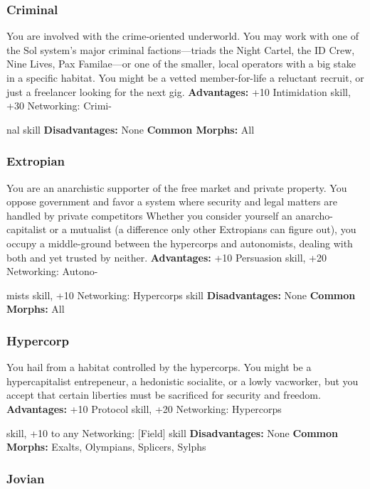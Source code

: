 \subsubsection{Criminal}

You are involved with the crime-oriented underworld. You 
may work with one of the Sol system's major criminal factions—triads
the Night Cartel, the ID Crew, Nine Lives, Pax
Familae—or one of the smaller, local operators with a big 
stake in a specific habitat. You might be a vetted member-for-life
a reluctant recruit, or just a freelancer looking for
the next gig.
\textbf{Advantages:} +10 Intimidation skill, +30 Networking: Crimi-

nal skill
\textbf{Disadvantages:} None
\textbf{Common Morphs:} All

\subsubsection{Extropian}

You are an anarchistic supporter of the free market and private
property. You oppose government and favor a system
where security and legal matters are handled by private competitors
Whether you consider yourself an anarcho-capitalist
or a mutualist (a difference only other Extropians can figure 
out), you occupy a middle-ground between the hypercorps 
and autonomists, dealing with both and yet trusted by neither.
\textbf{Advantages:} +10 Persuasion skill, +20 Networking: Autono-

mists skill, +10 Networking: Hypercorps skill
\textbf{Disadvantages:} None
\textbf{Common Morphs:} All

\subsubsection{Hypercorp}

You hail from a habitat controlled by the hypercorps. You 
might be a hypercapitalist entrepeneur, a hedonistic socialite, 
or a lowly vacworker, but you accept that certain liberties 
must be sacrificed for security and freedom.
\textbf{Advantages:} +10 Protocol skill, +20 Networking: Hypercorps 

skill, +10 to any Networking: [Field] skill
\textbf{Disadvantages:} None
\textbf{Common Morphs:} Exalts, Olympians, Splicers, Sylphs

\subsubsection{Jovian}

